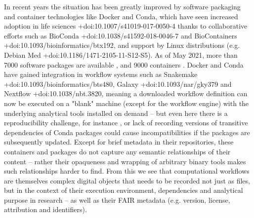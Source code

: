 {}In recent years the situation has been greatly improved by software packaging and container technologies like Docker and Conda, which have seen increased adoption in life sciences +{}{}{doi:10.1007/s41019-017-0050-4} thanks to collaborative efforts such as BioConda +{}{}{doi:10.1038/s41592-018-0046-7} and BioContainers +{}{}{doi:10.1093/bioinformatics/btx192}, and support by Linux distributions (e.g. Debian Med +{}{}{doi:10.1186/1471-2105-11-S12-S5}). As of May 2021, more than 7000 software packages are available , and 9000 containers . Docker and Conda have gained integration in workflow systems such as Snakemake +{}{}{doi:10.1093/bioinformatics/bts480}, Galaxy +{}{}{doi:10.1093/nar/gky379} and Nextflow +{}{}{doi:10.1038/nbt.3820}, meaning a downloaded workflow definition can now be executed on a "blank" machine (except for the workflow engine) with the underlying analytical tools installed on demand – but even here there is a reproducibility challenge, for instance , or lack of recording versions of transitive dependencies of Conda packages could cause incompatibilities if the packages are subsequently updated. Except for brief metadata in their repositories, these containers and packages do not capture any semantic relationships of their content – rather their opaqueness and wrapping of arbitrary binary tools makes such relationships harder to find.\markdownRendererInterblockSeparator
{}From this we see that computational workflows are themselves complex digital objects that needs to be recorded not just as files, but in the context of their execution environment, dependencies and analytical purpose in research – as well as their FAIR metadata (e.g. version, license, attribution and identifiers).\relax